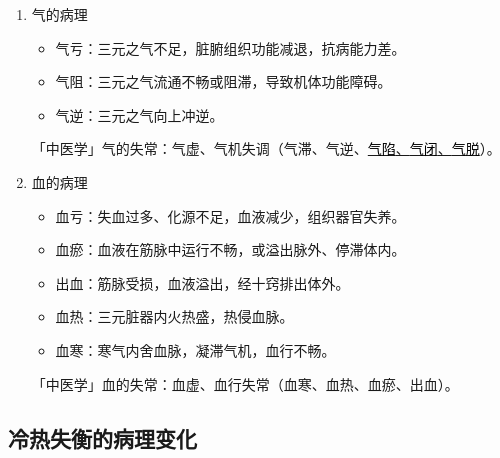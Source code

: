 \documentclass[cn,black,12pt,normal,founder]{elegantnote}
\newcommand{\redt}[1]{\textcolor{black}{{}#1}}      %
\begin{document}
\begin{enumerate}
  \item 气的病理
  \begin{itemize}
    \item 气亏：三元之气不足，脏腑组织功能减退，抗病能力差。
    \item 气阻：三元之气流通不畅或阻滞，导致机体功能障碍。
    \item 气逆：三元之气向上冲逆。
  \end{itemize}

  \begin{note}
  「中医学」气的失常：气虚、气机失调（气滞、气逆、\uline{\redt{气陷}、\redt{气闭}、\redt{气脱}}）。
  \end{note}

  \item 血的病理
  \begin{itemize}
    \item 血亏：失血过多、化源不足，血液减少，组织器官失养。
    \item 血瘀：血液在筋脉中运行不畅，或溢出脉外、停滞体内。
    \item 出血：筋脉受损，血液溢出，经十窍排出体外。
    \item 血热：三元脏器内火热盛，热侵血脉。
    \item 血寒：寒气内舍血脉，凝滞气机，血行不畅。
  \end{itemize}

  \begin{note}
  「中医学」血的失常：血虚、血行失常（血寒、血热、血瘀、出血）。
  \end{note}
\end{enumerate}

\subsection{冷热失衡的病理变化}
\end{document}
